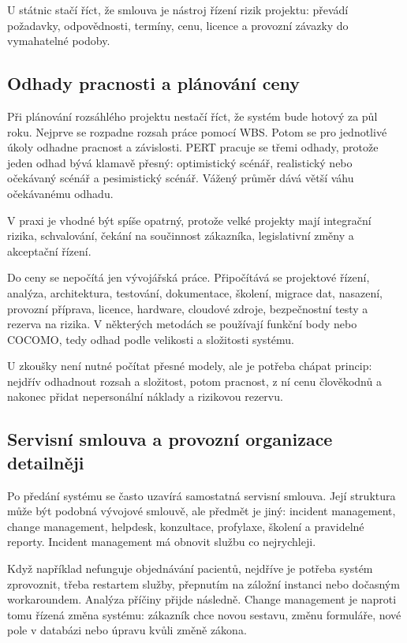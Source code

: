\documentclass[11pt,a4paper]{article}
\begin{document}
U státnic stačí říct, že smlouva je nástroj řízení rizik projektu: převádí požadavky, odpovědnosti, termíny, cenu, licence a provozní závazky do vymahatelné podoby.

\subsection*{Odhady pracnosti a plánování ceny}

Při plánování rozsáhlého projektu nestačí říct, že systém bude hotový za půl roku. Nejprve se rozpadne rozsah práce pomocí WBS. Potom se pro jednotlivé úkoly odhadne pracnost a závislosti. PERT pracuje se třemi odhady, protože jeden odhad bývá klamavě přesný: optimistický scénář, realistický nebo očekávaný scénář a pesimistický scénář. Vážený průměr dává větší váhu očekávanému odhadu.

V praxi je vhodné být spíše opatrný, protože velké projekty mají integrační rizika, schvalování, čekání na součinnost zákazníka, legislativní změny a akceptační řízení.

Do ceny se nepočítá jen vývojářská práce. Připočítává se projektové řízení, analýza, architektura, testování, dokumentace, školení, migrace dat, nasazení, provozní příprava, licence, hardware, cloudové zdroje, bezpečnostní testy a rezerva na rizika. V některých metodách se používají funkční body nebo COCOMO, tedy odhad podle velikosti a složitosti systému.

U zkoušky není nutné počítat přesné modely, ale je potřeba chápat princip: nejdřív odhadnout rozsah a složitost, potom pracnost, z ní cenu člověkodnů a nakonec přidat nepersonální náklady a rizikovou rezervu.

\subsection*{Servisní smlouva a provozní organizace detailněji}

Po předání systému se často uzavírá samostatná servisní smlouva. Její struktura může být podobná vývojové smlouvě, ale předmět je jiný: incident management, change management, helpdesk, konzultace, profylaxe, školení a pravidelné reporty. Incident management má obnovit službu co nejrychleji.

Když například nefunguje objednávání pacientů, nejdříve je potřeba systém zprovoznit, třeba restartem služby, přepnutím na záložní instanci nebo dočasným workaroundem. Analýza příčiny přijde následně. Change management je naproti tomu řízená změna systému: zákazník chce novou sestavu, změnu formuláře, nové pole v databázi nebo úpravu kvůli změně zákona.
\end{document}
